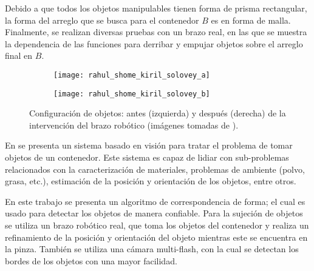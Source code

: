 Debido a que todos los objetos manipulables tienen forma de prisma rectangular, la forma del arreglo que se busca para el contenedor $B$ es en forma de malla.
Finalmente, se realizan diversas pruebas con un brazo real, en las que se muestra la dependencia de las funciones para derribar y empujar objetos sobre el arreglo final en $B$.
%
\begin{figure}[H]
	\begin{subfigure}{0.45\linewidth}
		\texttt{[image: rahul\_shome\_kiril\_solovey\_a]}%
		\label{subfig:bin_picking_dove_a}%
	\end{subfigure}%
	\hspace{0.5cm}%
	\begin{subfigure}{0.45\linewidth}
		\texttt{[image: rahul\_shome\_kiril\_solovey\_b]}%
		\label{subfig:bin_picking_dove_b}%
	\end{subfigure}%
	\caption{Configuración de objetos: antes (izquierda) y después (derecha) de la intervención del brazo robótico (imágenes tomadas de \cite{8793966}).}%
	\label{fig:8793966}%
\end{figure}
%
En \cite{doi:10.1177/0278364911436018} se presenta un sistema basado en visión para tratar el problema de tomar objetos de un contenedor.
Este sistema es capaz de lidiar con sub-problemas relacionados con la caracterización de materiales, problemas de ambiente (polvo, grasa, etc.), estimación de la posición y orientación de los objetos, entre otros.

En este trabajo se presenta un algoritmo de correspondencia de forma; el cual es usado para detectar los objetos de manera confiable.
Para la sujeción de objetos se utiliza un brazo robótico real, que toma los objetos del contenedor y realiza un refinamiento de la posición y orientación del objeto mientras este se encuentra en la pinza. 
También se utiliza una cámara multi-flash, con la cual se detectan los bordes de los objetos con una mayor facilidad.


